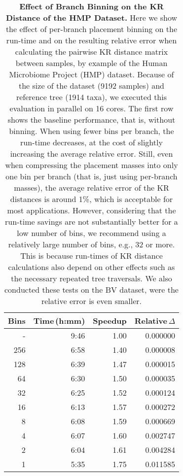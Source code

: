\begin{table}[htb]
\caption[Effect of Branch Binning on the KR Distance of the HMP Dataset]{
\textbf{Effect of Branch Binning on the KR Distance of the HMP Dataset.}
Here we show the effect of per-branch placement binning
on the run-time and on the resulting relative error when calculating the pairwise KR distance matrix between samples,
by example of the Human Microbiome Project (HMP) \cite{Huttenhower2012,Methe2012} dataset.
Because of the size of the dataset (\num{9192} samples) and reference tree (\num{1914} taxa),
we executed this evaluation in parallel on \num{16} cores.
The first row shows the baseline performance, that is, without binning.
When using fewer bins per branch, the run-time decreases,
at the cost of slightly increasing the average relative error.
Still, even when compressing the placement masses into only one bin per branch (that is, just using per-branch masses),
the average relative error of the KR distances is around 1\%, which is acceptable for most applications.
However, considering that the run-time savings are not substantially better for a low number of bins,
we recommend using a relatively large number of bins, e.g., \num{32} or more.
This is because run-times of KR distance calculations also depend on other effects
such as the necessary repeated tree traversals.
We also conducted these tests on the BV dataset, were the relative error is even smaller.
}
\label{tab:hmp_binning_error}
{
    \begin{center}
    \begin{tabular}{rrrr}
        \toprule
        Bins    &  Time\,(h:mm) &  Speedup  &  Relative\,$\Delta$ \\
        \midrule
        -     & 9:46   & 1.00   & 0.000000 \\
        256   & 6:58   & 1.40   & 0.000008 \\
        128   & 6:39   & 1.47   & 0.000015 \\
        64    & 6:30   & 1.50   & 0.000035 \\
        32    & 6:25   & 1.52   & 0.000124 \\
        16    & 6:13   & 1.57   & 0.000272 \\
        8     & 6:08   & 1.59   & 0.000669 \\
        4     & 6:07   & 1.60   & 0.002747 \\
        2     & 6:04   & 1.61   & 0.004284 \\
        1     & 5:35   & 1.75   & 0.011585 \\
        \bottomrule
    \end{tabular}
    \end{center}
}
\end{table}

